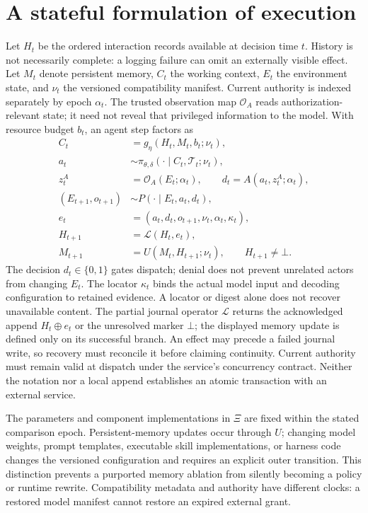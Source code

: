 \section{A stateful formulation of execution}\label{sec:C01:02}
Let $H_t$ be the ordered interaction records available at decision time $t$. History is not necessarily complete: a logging failure can omit an externally visible effect. Let $M_t$ denote persistent memory, $C_t$ the working context, $E_t$ the environment state, and $\nu_t$ the versioned compatibility manifest. Current authority is indexed separately by epoch $\alpha_t$. The trusted observation map $\mathcal O_A$ reads authorization-relevant state; it need not reveal that privileged information to the model. With resource budget $b_t$, an agent step factors as
\begin{equation}
\begin{aligned}
 C_t&=g_\eta(H_t,M_t,b_t;\nu_t),\\
 a_t&\sim\pi_{\theta,\delta}(\cdot\mid C_t,\mathcal T_t;\nu_t),\\
 z_t^A&=\mathcal O_A(E_t;\alpha_t),\qquad
 d_t=A(a_t,z_t^A;\alpha_t),\\
 (E_{t+1},o_{t+1})&\sim P(\cdot\mid E_t,a_t,d_t),\\
 e_t&=(a_t,d_t,o_{t+1},\nu_t,\alpha_t,\kappa_t),\\
 H_{t+1}&=\mathcal L(H_t,e_t),\\
 M_{t+1}&=U(M_t,H_{t+1};\nu_t),\qquad H_{t+1}\ne\bot.
\end{aligned}
 \label{eq:c01:step}
\end{equation}
The decision $d_t\in\{0,1\}$ gates dispatch; denial does not prevent unrelated actors from changing $E_t$. The locator $\kappa_t$ binds the actual model input and decoding configuration to retained evidence. A locator or digest alone does not recover unavailable content. The partial journal operator $\mathcal L$ returns the acknowledged append $H_t\oplus e_t$ or the unresolved marker $\bot$; the displayed memory update is defined only on its successful branch. An effect may precede a failed journal write, so recovery must reconcile it before claiming continuity. Current authority must remain valid at dispatch under the service's concurrency contract. Neither the notation nor a local append establishes an atomic transaction with an external service.

The parameters and component implementations in $\Xi$ are fixed within the stated comparison epoch. Persistent-memory updates occur through $U$; changing model weights, prompt templates, executable skill implementations, or harness code changes the versioned configuration and requires an explicit outer transition. This distinction prevents a purported memory ablation from silently becoming a policy or runtime rewrite. Compatibility metadata and authority have different clocks: a restored model manifest cannot restore an expired external grant.

